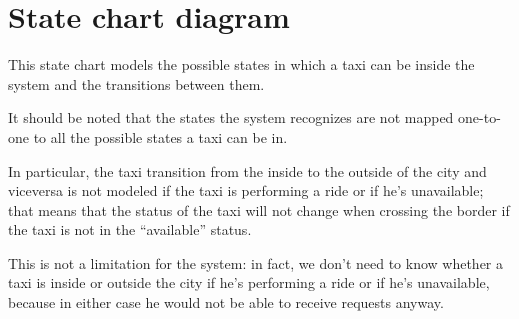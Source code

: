 \begin{landscape}
%
\end{landscape}


\section{State chart diagram}
This state chart models the possible states in which a taxi can be inside the system and the transitions between them.

It should be noted that the states the system recognizes are not mapped one-to-one to all the possible states a taxi can be in. 

In particular, the taxi transition from the inside to the outside of the city and viceversa is not modeled if the taxi is performing a ride or if he’s unavailable; that means that the status of the taxi will not change when crossing the border if the taxi is not in the “available” status. 

This is not a limitation for the system: in fact, we don’t need to know whether a taxi is inside or outside the city if he’s performing a ride or if he’s unavailable, because in either case he would not be able to receive requests anyway.

\begin{figure}[H]
\centering
{}
\end{figure}
\pagebreak

